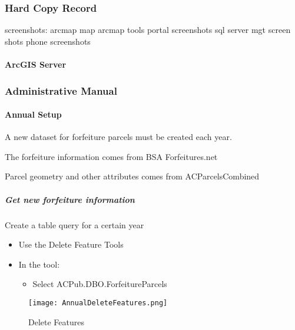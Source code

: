 \subsubsection{Hard Copy Record}
screenshots:
arcmap map
arcmap tools
portal screenshots
sql server mgt screen shots
phone screenshots
\paragraph{ArcGIS Server}
\clearpage
\subsubsection{Administrative Manual}
\vspace{.25in}

\paragraph{Annual Setup}

A new dataset for forfeiture parcels must be created each year.
\vspace{.15in}

\noindent The forfeiture information comes from BSA Forfeitures.net
\vspace{.15in}

Parcel geometry and other attributes comes from ACParcelsCombined
\vspace{.25in}

\subparagraph{Get new forfeiture information}

{\Large Create a table query for a certain year}
\vspace{.25in}

\vspace{.25in}

\begin{itemize}
\item {\Large Use the Delete Feature Tools}
\item {\Large In the tool:}
\begin{itemize}
\item Select ACPub.DBO.ForfeitureParcels
\end{itemize}
\end{itemize}
\vspace{.25in}

\begin{figure}[h!]
\centering
    \texttt{[image: AnnualDeleteFeatures.png]}
\caption{Delete Features}
\end{figure}
\vspace{.25in}

